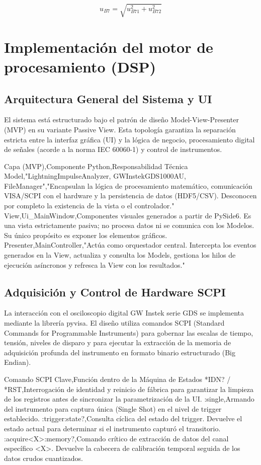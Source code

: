 \begin{equation}
u_{B7} = \sqrt{u_{B71}^2 + u_{B72}^2}
\label{eq:u_B7_combinada}
\end{equation}


\newpage
\chapter{Implementación del motor de procesamiento (DSP)}
\vspace{3\baselineskip}

\section{Arquitectura General del Sistema y UI}
El sistema está estructurado bajo el patrón de diseño Model-View-Presenter (MVP) en su variante Passive View. Esta topología garantiza la separación estricta entre la interfaz gráfica (UI) y la lógica de negocio, procesamiento digital de señales (acorde a la norma IEC 60060-1) y control de instrumentos.

Capa (MVP),Componente Python,Responsabilidad Técnica
Model,"LightningImpulseAnalyzer, GWInstekGDS1000AU, FileManager","Encapsulan la lógica de procesamiento matemático, comunicación VISA/SCPI con el hardware y la persistencia de datos (HDF5/CSV). Desconocen por completo la existencia de la vista o el controlador."
View,Ui\_MainWindow,Componentes visuales generados a partir de PySide6. Es una vista estrictamente pasiva; no procesa datos ni se comunica con los Modelos. Su único propósito es exponer los elementos gráficos.
Presenter,MainController,"Actúa como orquestador central. Intercepta los eventos generados en la View, actualiza y consulta los Models, gestiona los hilos de ejecución asíncronos y refresca la View con los resultados."


\section{Adquisición y Control de Hardware SCPI}
La interacción con el osciloscopio digital GW Instek serie GDS se implementa mediante la librería pyvisa. El diseño utiliza comandos SCPI (Standard Commands for Programmable Instruments) para gobernar las escalas de tiempo, tensión, niveles de disparo y para ejecutar la extracción de la memoria de adquisición profunda del instrumento en formato binario estructurado (Big Endian).

Comando SCPI Clave,Función dentro de la Máquina de Estados
*IDN? / *RST,Interrogación de identidad y reinicio de fábrica para garantizar la limpieza de los registros antes de sincronizar la parametrización de la UI.
:single,Armando del instrumento para captura única (Single Shot) en el nivel de trigger establecido.
:trigger:state?,Consulta cíclica del estado del trigger. Devuelve el estado actual para determinar si el instrumento capturó el transitorio.
:acquire<X>:memory?,Comando crítico de extracción de datos del canal específico <X>. Devuelve la cabecera de calibración temporal seguida de los datos crudos cuantizados.

